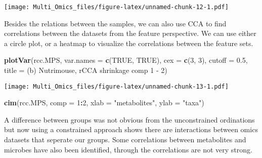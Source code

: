\documentclass[
]{article}
\newenvironment{Shaded}{\begin{snugshade}}{\end{snugshade}}
\newcommand{\AttributeTok}[1]{\textcolor[rgb]{0.13,0.29,0.53}{#1}}
\newcommand{\ConstantTok}[1]{\textcolor[rgb]{0.56,0.35,0.01}{#1}}
\newcommand{\DecValTok}[1]{\textcolor[rgb]{0.00,0.00,0.81}{#1}}
\newcommand{\FloatTok}[1]{\textcolor[rgb]{0.00,0.00,0.81}{#1}}
\newcommand{\FunctionTok}[1]{\textcolor[rgb]{0.13,0.29,0.53}{\textbf{#1}}}
\newcommand{\NormalTok}[1]{#1}
\newcommand{\SpecialCharTok}[1]{\textcolor[rgb]{0.81,0.36,0.00}{\textbf{#1}}}
\newcommand{\StringTok}[1]{\textcolor[rgb]{0.31,0.60,0.02}{#1}}
\begin{document}
\begin{Shaded}
\end{Shaded}

\texttt{[image: Multi\_Omics\_files/figure-latex/unnamed-chunk-12-1.pdf]}

Besides the relations between the samples, we can also use CCA to find
correlations between the datasets from the feature perspective. We can
use either a circle plot, or a heatmap to visualize the correlations
between the feature sets.

\begin{Shaded}
\begin{Highlighting}[]
\FunctionTok{plotVar}\NormalTok{(rcc.MPS, }\AttributeTok{var.names =} \FunctionTok{c}\NormalTok{(}\ConstantTok{TRUE}\NormalTok{, }\ConstantTok{TRUE}\NormalTok{),}
        \AttributeTok{cex =} \FunctionTok{c}\NormalTok{(}\DecValTok{3}\NormalTok{, }\DecValTok{3}\NormalTok{), }\AttributeTok{cutoff =} \FloatTok{0.5}\NormalTok{,}
        \AttributeTok{title =} \StringTok{\textquotesingle{}(b) Nutrimouse, rCCA shrinkage comp 1 {-} 2\textquotesingle{}}\NormalTok{)}
\end{Highlighting}
\end{Shaded}

\texttt{[image: Multi\_Omics\_files/figure-latex/unnamed-chunk-13-1.pdf]}

\begin{Shaded}
\begin{Highlighting}[]
\FunctionTok{cim}\NormalTok{(rcc.MPS, }\AttributeTok{comp =} \DecValTok{1}\SpecialCharTok{:}\DecValTok{2}\NormalTok{, }\AttributeTok{xlab =} \StringTok{"metabolites"}\NormalTok{, }\AttributeTok{ylab =} \StringTok{"taxa"}\NormalTok{)}
\end{Highlighting}
\end{Shaded}

A difference between groups was not obvious from the unconstrained
ordinations but now using a constrained approach shows there are
interactions between omics datasets that seperate our groups. Some
correlations between metabolites and microbes have also been identified,
through the correlations are not very strong.
\end{document}
